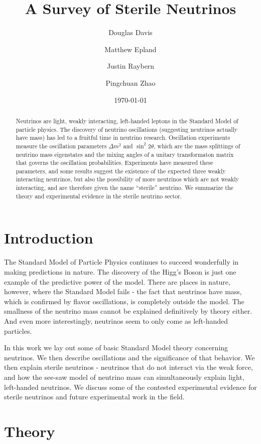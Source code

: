 \documentclass[aps,prd,twocolumn,nofootinbib]{revtex4-1}
\begin{document}
\title{A Survey of Sterile Neutrinos}
\author{Douglas Davis}
\author{Matthew Epland}
\author{Justin Raybern}
\author{Pingchuan Zhao}
\date{\today}
\begin{abstract}
Neutrinos are light, weakly interacting, left-handed leptons in the Standard Model of particle physics. The discovery of neutrino oscillations (suggesting neutrinos actually have mass) has led to a fruitful time in neutrino research. Oscillation experiments measure the oscillation parameters $\Delta m^2$ and $\sin^2 2\theta$, which are the mass splittings of neutrino mass eigenstates and the mixing angles of a unitary transformaton matrix that governs the oscillation probabilities. Experiments have measured these parameters, and some results suggest the existence of the expected three weakly interacting neutrinos, but also the possibility of more neutrinos which are not weakly interacting, and are therefore given the name ``sterile'' neutrino. We summarize the theory and experimental evidence in the sterile neutrino sector.
\end{abstract}\maketitle
\section{Introduction}
The Standard Model of Particle Physics continues to succeed wonderfully in making predictions in nature.  The discovery of the Higg's Boson is just one example of the predictive power of the model.  There are places in nature, however, where the Standard Model fails - the fact that neutrinos have mass, which is confirmed by flavor oscillations, is completely outside the model.  The smallness of the neutrino mass cannot be explained definitively by theory either.  And even more interestingly, neutrinos seem to only come as left-handed particles.

In this work we lay out some of basic Standard Model theory concerning neutrinos.  We then describe oscillations and the significance of that behavior.  We then explain sterile neutrinos - neutrinos that do not interact via the weak force, and how the see-saw model of neutrino mass can simultaneously explain light, left-handed neutrinos.  We discuss some of the contested experimental evidence for sterile neutrinos and future experimental work in the field.
\section{Theory}
\label{sec:theory}
\end{document}
